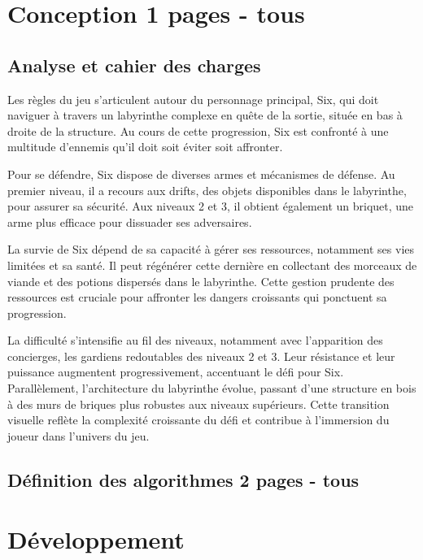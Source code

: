 \documentclass[10pt]{article}
\begin{document}
   \clearpage
\section{Conception 1 pages - tous}
\subsection{Analyse et cahier des charges}
Les règles du jeu s'articulent autour du personnage principal, Six, qui doit naviguer à travers un \gls{labyrinthe} complexe en quête de la sortie, située en bas à droite de la structure. Au cours de cette progression, Six est confronté à une multitude d'\gls{ennemis} qu'il doit soit éviter soit affronter.

Pour se défendre, Six dispose de diverses \glspl{arme} et mécanismes de défense. Au premier niveau, il a recours aux \gls{drifts}, des objets disponibles dans le labyrinthe, pour assurer sa sécurité. Aux niveaux 2 et 3, il obtient également un \gls{briquet}, une arme plus efficace pour dissuader ses adversaires.

La survie de Six dépend de sa capacité à gérer ses \glspl{ressource}, notamment ses vies limitées et sa santé. Il peut régénérer cette dernière en collectant des morceaux de viande et des potions dispersés dans le labyrinthe. Cette gestion prudente des ressources est cruciale pour affronter les dangers croissants qui ponctuent sa progression.

La difficulté s'intensifie au fil des niveaux, notamment avec l'apparition des \glspl{concierge}, les gardiens redoutables des niveaux 2 et 3. Leur résistance et leur puissance augmentent progressivement, accentuant le défi pour Six. Parallèlement, l'architecture du labyrinthe évolue, passant d'une structure en bois à des murs de briques plus robustes aux niveaux supérieurs. Cette transition visuelle reflète la complexité croissante du défi et contribue à l'immersion du joueur dans l'univers du jeu.



   \subsection{Définition des algorithmes 2 pages - tous}

\section{Développement}
\end{document}
